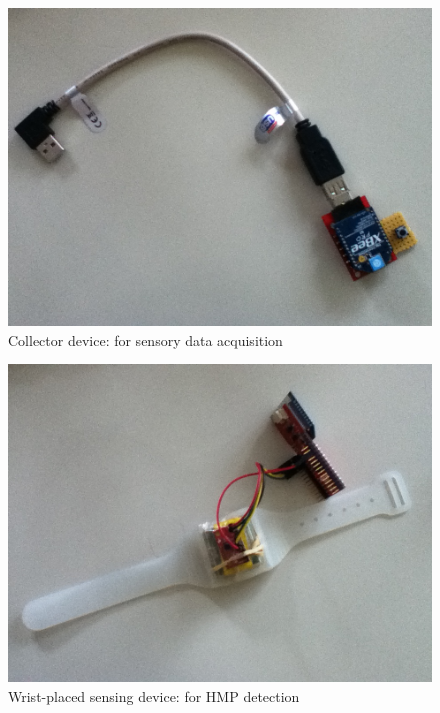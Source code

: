\documentclass[10pt,a4paper]{report}
\begin{document}
\begin{figure}
\centering
\includegraphics[scale=0.35]{HW_collector.jpg}
\caption{Collector device: for sensory data acquisition}
\label{fig:collector}
\end{figure}
\begin{figure}
\centering
\includegraphics[scale=0.35]{HW_wrist_device.jpg}
\caption{Wrist-placed sensing device: for HMP detection}
\label{fig:wrist_device}
\end{figure}
\end{document}
